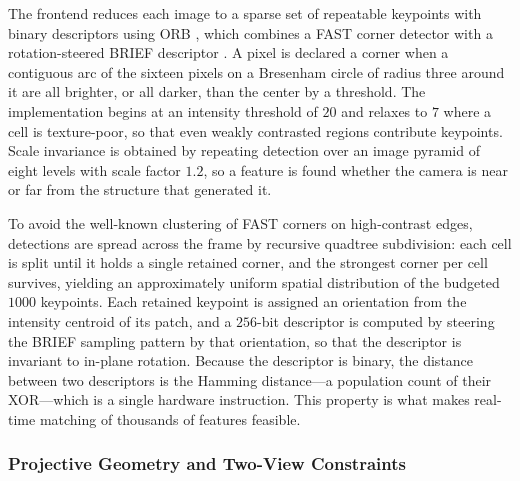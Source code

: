 The frontend reduces each image to a sparse set of repeatable keypoints with binary descriptors using ORB \cite{rublee2011orb}, which combines a FAST corner detector \cite{rosten2006fast} with a rotation-steered BRIEF descriptor \cite{calonder2010brief}. A pixel is declared a corner when a contiguous arc of the sixteen pixels on a Bresenham circle of radius three around it are all brighter, or all darker, than the center by a threshold. The implementation begins at an intensity threshold of $20$ and relaxes to $7$ where a cell is texture-poor, so that even weakly contrasted regions contribute keypoints. Scale invariance is obtained by repeating detection over an image pyramid of eight levels with scale factor $1.2$, so a feature is found whether the camera is near or far from the structure that generated it.

To avoid the well-known clustering of FAST corners on high-contrast edges, detections are spread across the frame by recursive quadtree subdivision: each cell is split until it holds a single retained corner, and the strongest corner per cell survives, yielding an approximately uniform spatial distribution of the budgeted $1000$ keypoints. Each retained keypoint is assigned an orientation from the intensity centroid of its patch, and a $256$-bit descriptor is computed by steering the BRIEF sampling pattern by that orientation, so that the descriptor is invariant to in-plane rotation. Because the descriptor is binary, the distance between two descriptors is the Hamming distance---a population count of their XOR---which is a single hardware instruction. This property is what makes real-time matching of thousands of features feasible.

\subsubsection{Projective Geometry and Two-View Constraints}

